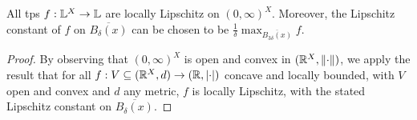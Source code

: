 \begin{theorem}\label{thmTLSlocLip}
All tps $f:\mathbb{L}^X\to\mathbb{L}$ are locally Lipschitz on $(0,\infty)^X$.
Moreover, the Lipschitz constant of $f$ on $\overline{B_{\delta}(x)}$ can be chosen to be $\frac{1}{\delta}\max_{\overline{B_{3\delta}(x)}} f$.
\end{theorem}
\begin{proof}
By observing that $(0,\infty)^X$ is open and convex in $(\mathbb{R}^X,\lVert\cdot\rVert)$, we apply the result that for all $f:V\subseteq (\mathbb{R}^X,d) \to (\mathbb{R},\left\lvert\cdot\right\rvert)$ concave and locally bounded, with $V$ open and convex and $d$ any metric, $f$ is locally Lipschitz, with the stated Lipschitz constant on $\overline{B_{\delta}(x)}$. %
\end{proof}

